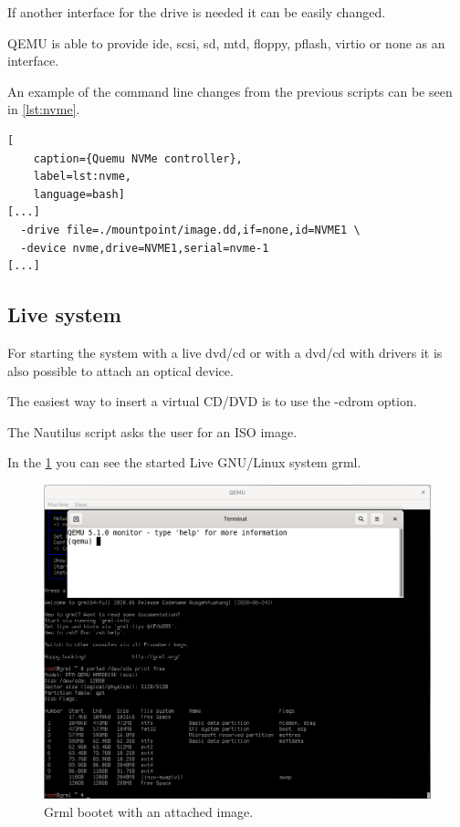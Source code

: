 If another interface for the drive is needed it can be easily changed.

QEMU is able to provide ide, scsi, sd, mtd, floppy, pflash, virtio or none as an interface.

An example of the command line changes from the previous scripts can be seen in \cref{lst:nvme}.

\begin{lstlisting}[
    caption={Quemu NVMe controller},
    label=lst:nvme,
    language=bash]
[...]
  -drive file=./mountpoint/image.dd,if=none,id=NVME1 \
  -device nvme,drive=NVME1,serial=nvme-1
[...]
\end{lstlisting}

\subsection{Live system}

For starting the system with a live dvd/cd or with a dvd/cd with drivers it is also possible to attach an optical device.

The easiest way to insert a virtual CD/DVD is to use the \glqq{}-cdrom\grqq{} option.

The Nautilus script asks the user for an ISO image.

In the \cref{fig:cdrom} you can see the started Live GNU/Linux system \glqq{}grml\grqq{}.

\begin{figure}[htbp]  %
  \centering
  \includegraphics[width=.75\textwidth]{figures/boot-cdrom-grml.png}
  \caption[Qemu with CD/DVD]{Grml bootet with an attached image.}
  \label{fig:cdrom}
\end{figure}

